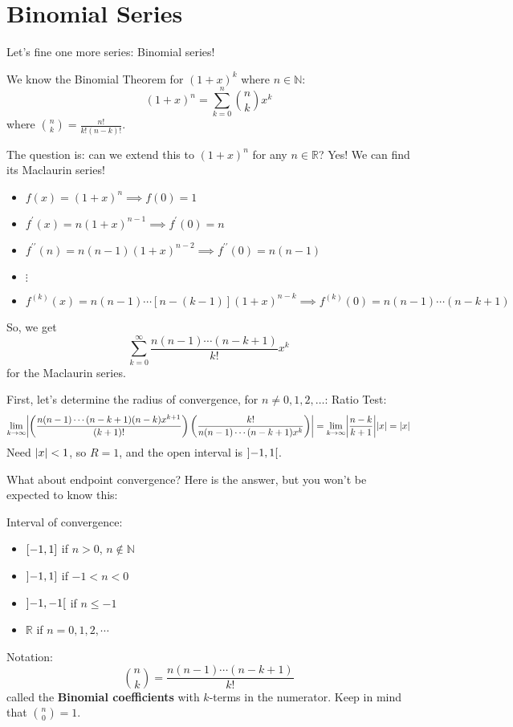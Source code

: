 \setcounter{section}{8}
\section{Binomial Series}
Let's fine one more series: Binomial series!

We know the Binomial Theorem for $ (1+x)^k $ where
$ n\in\mathbb{N} $:
\[ (1+x)^n=\sum\limits_{k=0}^{n} \binom{n}{k}x^k \]
where $ \displaystyle \binom{n}{k}=\frac{n!}{k!(n-k)!} $.

The question is: can we extend this to
$ (1+x)^n $ for any $ n\in\mathbb{R} $? Yes! We can find
its Maclaurin series!
\begin{itemize}
    \item $ f(x)=(1+x)^n\implies f(0)=1 $
    \item $ f^\prime(x)=n(1+x)^{n-1}\implies f^\prime(0)=n $
    \item $ f^{\prime\prime}(n)=n(n-1)(1+x)^{n-2}\implies f^{\prime\prime}(0)=n(n-1) $
    \item $ \vdots $
    \item $ f^{(k)}(x)=n(n-1)\cdots\left[ n-(k-1) \right](1+x)^{n-k}
              \implies f^{(k)}(0)=n(n-1)\cdots(n-k+1) $
\end{itemize}
So, we get
\[ \sum\limits_{k=0}^{\infty}\frac{n(n-1)\cdots(n-k+1)}{k!} x^k  \]
for the Maclaurin series.

First, let's determine the radius of convergence, for $ n\neq 0,1,2,\ldots $:
Ratio Test:
\[ \lim\limits_{{k} \to {\infty}}
    \abs*{\left( \frac{n(n-1)\cdots(n-k+1)(n-k)x^{k+1}}{(k+1)!}  \right)
    \left( \frac{k!}{n(n-1)\cdots(n-k+1)x^k}  \right)}
    =\lim\limits_{{k} \to {\infty}} \abs*{\frac{n-k}{k+1}}\abs{x}=\abs{x} \]
Need $ \lvert x\rvert<1 $, so $ R=1 $, and the open interval is
$ \interval[open]{-1}{1} $.

What about endpoint convergence? Here is the answer,
but you won't be expected to know this:

Interval of convergence:
\begin{itemize}
    \item $ \interval{-1}{1} $ if $ n>0 $, $ n\notin\mathbb{N} $
    \item $ \interval[open left]{-1}{1} $ if $ -1<n< 0$
    \item $ \interval[open]{-1}{-1} $ if $ n\leqslant -1 $
    \item $ \mathbb{R} $ if $ n=0,1,2,\cdots $
\end{itemize}
Notation:
\[ \binom{n}{k}=
    \frac{n(n-1)\cdots(n-k+1)}{k!} \]
called the \textbf{Binomial coefficients} with
$ k $-terms in the numerator. Keep in mind that $ \binom{n}{0}=1 $.

